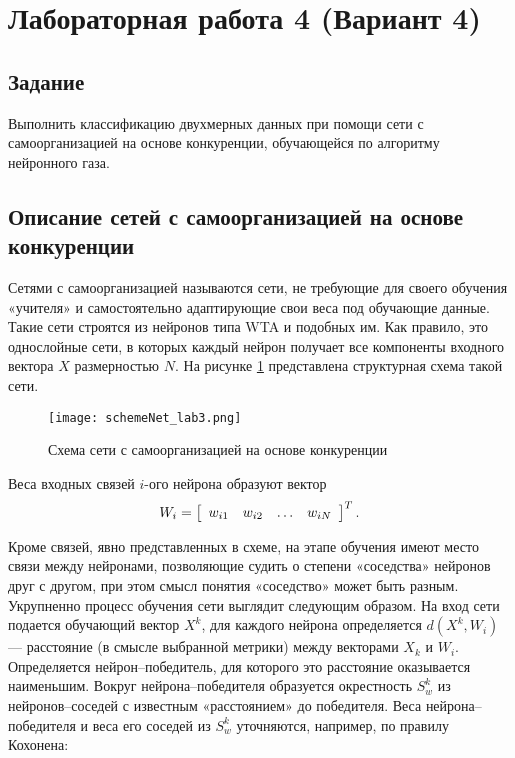 \newpage
\section{Лабораторная работа 4 (Вариант 4)}
\subsection{Задание}

Выполнить классификацию двухмерных данных при помощи сети с самоорганизацией на основе конкуренции, обучающейся по алгоритму нейронного газа.

\subsection{Описание сетей с самоорганизацией на основе конкуренции}
Сетями с самоорганизацией называются сети, не требующие для своего
обучения «учителя» и самостоятельно адаптирующие свои веса под обучающие
данные. Такие сети строятся из нейронов типа WTA и подобных
им. Как правило, это однослойные сети, в которых каждый нейрон получает
все компоненты входного вектора $X$ размерностью $N$. На рисунке \ref{img:schemeNet_lab3}
представлена структурная схема такой сети.

\begin{figure}[H]
\centering
\texttt{[image: schemeNet\_lab3.png]}
\caption{Схема сети с самоорганизацией на основе конкуренции}
\label{img:schemeNet_lab3}
\end{figure}

Веса входных связей $i$-ого нейрона образуют вектор
\begin{equation}
    W_{i} = \left[ \begin{array} { l l l l }{w_{i 1}} & {w_{i 2}}&{\dots}&{w_{ i N }}\end{array}\right]^{T} .
\end{equation}

Кроме связей, явно представленных в схеме, на этапе обучения имеют место
связи между нейронами, позволяющие судить о степени «соседства»
нейронов друг с другом, при этом смысл понятия «соседство» может
быть разным.
Укрупненно процесс обучения сети выглядит следующим образом. На
вход сети подается обучающий вектор $X^k$, для каждого нейрона определяется
$d(X^k, W_i)$ — расстояние (в смысле выбранной метрики) между
векторами $X_k$ и $W_i$. Определяется нейрон–победитель, для которого это
расстояние оказывается наименьшим. Вокруг нейрона–победителя образуется окрестность $S^k_w$ из нейронов–соседей с известным «расстоянием» до победителя. Веса нейрона–победителя и веса его соседей из $S^k_w$ уточняются, например, по правилу Кохонена:

